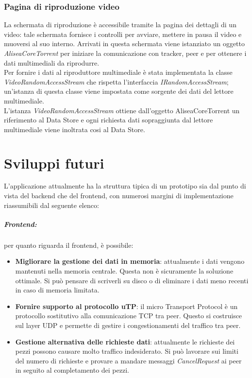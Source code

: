 \documentclass[a4]{book}
\begin{document}
\subsection{Pagina di riproduzione video}
La schermata di riproduzione è accessibile tramite la pagina dei dettagli di un video: tale schermata fornisce i controlli per avviare, mettere in pausa il video e muoversi al suo interno.\newline
Arrivati in questa schermata viene istanziato un oggetto \textit{AliseaCoreTorrent} per iniziare la comunicazione con tracker, peer e per ottenere i dati multimediali da riprodurre.\\
Per fornire i dati al riproduttore multimediale è stata implementata la classe \textit{VideoRandomAccessStream} che rispetta l'interfaccia \textit{IRandomAccessStream}; un'istanza di questa classe viene impostata come sorgente dei dati del lettore multimediale.\\
L'istanza \textit{VideoRandomAccessStream} ottiene dall'oggetto AliseaCoreTorrent un riferimento al Data Store e ogni richiesta dati sopraggiunta dal lettore multimediale viene inoltrata cosi al Data Store.



\chapter{Sviluppi futuri}
L'applicazione attualmente ha la struttura tipica di un prototipo sia dal punto di vista del backend che del frontend, con numerosi margini di implementazione riassumibili dal seguente elenco: \newline

\paragraph{Frontend:} per quanto riguarda il frontend, è possibile:
\begin{itemize}
	\item \textbf{Migliorare la gestione dei dati in memoria}: attualmente i dati vengono mantenuti nella memoria centrale. Questa non è sicuramente la soluzione ottimale. Si può pensare di scriverli su disco o di eliminare i dati meno recenti in caso di memoria limitata.
	\item\textbf{Fornire supporto al protocollo uTP}: il micro Transport Protocol è un protocollo sostitutivo alla comunicazione TCP tra peer. Questo si costruisce sul layer UDP e permette di gestire i congestionamenti del traffico tra peer.
	\item\textbf{Gestione alternativa delle richieste dati}: attualmente le richieste dei pezzi possono causare molto traffico indesiderato. Si può lavorare sui limiti del numero di richieste e provare a mandare messaggi \textit{CancelRequest} ai peer in seguito al completamento dei pezzi.
\end{itemize}
\end{document}
